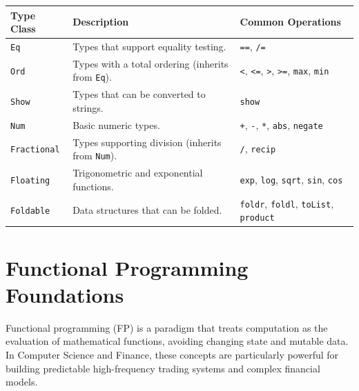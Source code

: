 \documentclass[12pt]{article}
\begin{document}
\begin{center}
  \begin{tabular}{|l|p{6cm}|p{4cm}|}
    \hline
    \textbf{Type Class} & \textbf{Description}                                     & \textbf{Common Operations}                                                   \\
    \hline
    \texttt{Eq}         & Types that support equality testing.                     & \texttt{==}, \texttt{/=}                                                     \\
    \hline
    \texttt{Ord}        & Types with a total ordering (inherits from \texttt{Eq}). & \texttt{<}, \texttt{<=}, \texttt{>}, \texttt{>=}, \texttt{max}, \texttt{min} \\
    \hline
    \texttt{Show}       & Types that can be converted to strings.                  & \texttt{show}                                                                \\
    \hline
    \texttt{Num}        & Basic numeric types.                                     & \texttt{+}, \texttt{-}, \texttt{*}, \texttt{abs}, \texttt{negate}            \\
    \hline
    \texttt{Fractional} & Types supporting division (inherits from \texttt{Num}).  & \texttt{/}, \texttt{recip}                                                   \\
    \hline
    \texttt{Floating}   & Trigonometric and exponential functions.                 & \texttt{exp}, \texttt{log}, \texttt{sqrt}, \texttt{sin}, \texttt{cos}        \\
    \hline
    \texttt{Foldable}   & Data structures that can be folded.                      & \texttt{foldr}, \texttt{foldl}, \texttt{toList}, \texttt{product}            \\
    \hline
  \end{tabular}
\end{center}


\section{Functional Programming Foundations}

Functional programming (FP) is a paradigm that treats computation as the evaluation of mathematical functions, avoiding changing state and mutable data. In Computer Science and Finance, these concepts are particularly powerful for building predictable high-frequency trading systems and complex financial models.
\end{document}
